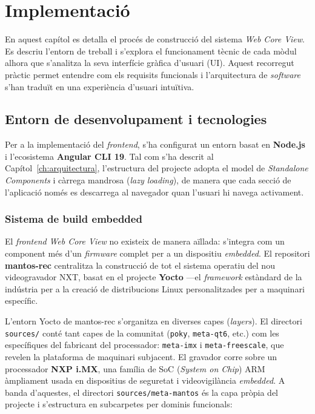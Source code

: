\chapter{Implementació}
\label{ch:implementacio}

En aquest capítol es detalla el procés de construcció del sistema \textit{Web Core View}. Es descriu l'entorn de treball i s'explora el funcionament tècnic de cada mòdul alhora que s'analitza la seva interfície gràfica d'usuari (UI). Aquest recorregut pràctic permet entendre com els requisits funcionals i l'arquitectura de \textit{software} s'han traduït en una experiència d'usuari intuïtiva.

\section{Entorn de desenvolupament i tecnologies}
Per a la implementació del \textit{frontend}, s'ha configurat un entorn basat en \textbf{Node.js} i l'ecosistema \textbf{Angular CLI 19}. Tal com s'ha descrit al Capítol~\ref{ch:arquitectura}, l'estructura del projecte adopta el model de \textit{Standalone Components} i càrrega mandrosa (\textit{lazy loading}), de manera que cada secció de l'aplicació només es descarrega al navegador quan l'usuari hi navega activament.

\subsection{Sistema de build embedded}

El \textit{frontend} \textit{Web Core View} no existeix de manera aïllada: s'integra com un component més d'un \textit{firmware} complet per a un dispositiu \textit{embedded}. El repositori \textbf{mantos-rec} centralitza la construcció de tot el sistema operatiu del nou videogravador NXT, basat en el projecte \textbf{Yocto} —el \textit{framework} estàndard de la indústria per a la creació de distribucions Linux personalitzades per a maquinari específic.

L'entorn Yocto de mantos-rec s'organitza en diverses capes (\textit{layers}). El directori \texttt{sources/} conté tant capes de la comunitat (\texttt{poky}, \texttt{meta-qt6}, etc.) com les específiques del fabricant del processador: \texttt{meta-imx} i \texttt{meta-freescale}, que revelen la plataforma de maquinari subjacent. El gravador corre sobre un processador \textbf{NXP i.MX}, una família de SoC (\textit{System on Chip}) ARM àmpliament usada en dispositius de seguretat i videovigilància \textit{embedded}. A banda d'aquestes, el directori \texttt{sources/meta-mantos} és la capa pròpia del projecte i s'estructura en subcarpetes per dominis funcionals:

